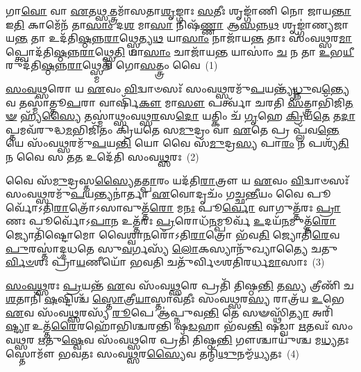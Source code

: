 \setcounter{anuvakam}{0}
𑌗𑌾\-\ul{𑌵𑍋} 𑌵𑌾 \ul{𑌏}\-𑌤\-\ul{𑌥𑍍𑌸}\-𑌤𑍍𑌤𑍍𑌰𑌮𑌾᳴𑌸𑌤𑌾\-\ul{𑌶𑍃}\-𑌙𑍍𑌗𑌾𑌃 \ul{𑌸}\-𑌤𑍀𑌃 𑌶𑍃𑌙𑍍𑌗𑌾᳴𑌣𑌿 𑌨𑍋 𑌜𑌾𑌯\-\ul{𑌨𑍍𑌤𑌾} 𑌇\-\ul{𑌤𑌿} 𑌕𑌾𑌮𑍇᳴𑌨᳴ 𑌤𑌾\-\ul{𑌸𑌾𑌂} 𑌦\-\ul{𑌶} 𑌮𑌾\-\ul{𑌸𑌾} 𑌨𑌿𑌷᳴\-\ul{𑌣𑍍𑌣𑌾} 𑌆\-\ul{𑌸}\-𑌨𑍍𑌨\-\ul{𑌥} 𑌶𑍃𑌙𑍍𑌗𑌾॑𑌣𑍍𑌯𑌜𑌾𑌯\-\ul{𑌨𑍍𑌤} 𑌤𑌾 𑌉𑌦᳴𑌤𑌿\-\ul{𑌷𑍍𑌠}\-𑌨𑍍𑌨\-\ul{𑌰𑌾}\-𑌥𑍍𑌸𑍍𑌮𑍇𑌤𑍍𑌯\-\ul{𑌥} 𑌯𑌾\-\ul{𑌸𑌾𑌂} 𑌨𑌾𑌜𑌾᳴𑌯\-\ul{𑌨𑍍𑌤} 𑌤𑌾𑌃 𑌸𑌂᳴𑌵\-\ul{𑌥𑍍𑌸}\-𑌰\-\ul{𑌮𑌾}\-𑌪𑍍𑌤𑍍𑌵𑍋𑌦᳴𑌤𑌿\-\ul{𑌷𑍍𑌠}\-𑌨𑍍𑌨\-\ul{𑌰𑌾}\-𑌥𑍍𑌸𑍍𑌮𑍇\-\ul{𑌤𑌿} 𑌯𑌾\-\ul{𑌸𑌾𑌂} 𑌚𑌾𑌜𑌾᳴𑌯\-\ul{𑌨𑍍𑌤} 𑌯𑌾𑌸𑌾𑌂॑ \ul{𑌚} 𑌨 𑌤𑌾 \ul{𑌉}\-𑌭\-\ul{𑌯𑍀}\-𑌰𑍁𑌦᳴𑌤𑌿\-\ul{𑌷𑍍𑌠}\-𑌨𑍍𑌨\-\ul{𑌰𑌾}\-𑌥𑍍𑌸𑍍𑌮𑍇𑌤𑌿᳴ 𑌗𑍋\-\ul{𑌸}\-𑌤𑍍𑌤𑍍𑌰𑌂 𑌵𑍈~(1)

\-\ul{𑌸𑌂}\-\-\ul{𑌵}\-\-\ul{𑌥𑍍𑌸}\-𑌰𑍋 𑌯 \ul{𑌏}\-𑌵𑌂 \ul{𑌵𑌿}\-𑌦𑍍𑌵𑌾𑍞𑌸𑌃᳴ 𑌸𑌂𑌵\-\ul{𑌥𑍍𑌸}\-𑌰𑌮𑍁᳴\-\ul{𑌪}\-𑌯𑌨𑍍𑌤𑍍𑌯𑍃᳴\-\ul{𑌧𑍍𑌨𑍁}\-𑌵\-\ul{𑌨𑍍𑌤𑍍𑌯𑍇}\-𑌵 𑌤𑌸𑍍𑌮𑌾॑𑌤𑍍𑌤𑍂\-\ul{𑌪}\-𑌰𑌾 𑌵𑌾𑌰𑍍\mbox{}𑌷𑌿᳴\-\ul{𑌕𑍗} 𑌮𑌾\-\ul{𑌸𑍗} 𑌪𑌰𑍍𑌤𑍍𑌵𑌾᳴ 𑌚𑌰𑌤𑌿 \ul{𑌸}\-𑌤𑍍𑌤𑍍𑌰𑌾𑌭𑌿᳴𑌜𑌿\-\ul{𑌤}\-\-\ul{𑍟} 𑌹𑍍𑌯᳴\-\ul{𑌸𑍍𑌯𑍈} 𑌤𑌸𑍍𑌮𑌾॑𑌥𑍍𑌸𑌂𑌵𑌥𑍍𑌸\-\ul{𑌰}\-𑌸\-\ul{𑌦𑍋} 𑌯𑌤𑍍𑌕𑌿𑌂 𑌚᳴ \ul{𑌗𑍃}\-𑌹𑍇 \ul{𑌕𑍍𑌰𑌿}\-𑌯\-\ul{𑌤𑍇} 𑌤\-\ul{𑌦𑌾}\-𑌪𑍍𑌤𑌮𑌵᳴𑌰𑍁𑌦𑍍𑌧\-\ul{𑌮}\-𑌭𑌿𑌜𑌿᳴𑌤𑌂 𑌕𑍍𑌰𑌿𑌯𑌤𑍇 𑌸\-\ul{𑌮𑍁}\-𑌦𑍍𑌰𑌂 𑌵𑌾 \ul{𑌏}\-𑌤𑍇 𑌪𑍍𑌰 𑌪𑍍𑌲᳴𑌵\-\ul{𑌨𑍍𑌤𑍇} 𑌯𑍇 𑌸𑌂᳴𑌵\-\ul{𑌥𑍍𑌸}\-𑌰𑌮𑍁᳴\-\ul{𑌪}\-𑌯\-\ul{𑌨𑍍𑌤𑌿} 𑌯𑍋 𑌵𑍈 𑌸᳴\-\ul{𑌮𑍁}\-𑌦𑍍𑌰\-\ul{𑌸𑍍𑌯} 𑌪𑌾\-\ul{𑌰𑌂} 𑌨 𑌪𑌶𑍍𑌯᳴\-\ul{𑌤𑌿} 𑌨 𑌵𑍈 𑌸 𑌤\-\ul{𑌤} 𑌉𑌦𑍇᳴𑌤𑌿 𑌸𑌂𑌵\-\ul{𑌥𑍍𑌸}\-𑌰𑌃~(2)

𑌵𑍈 𑌸᳴\-\ul{𑌮𑍁}\-𑌦𑍍𑌰𑌸𑍍𑌤\-\ul{𑌸𑍍𑌯𑍈}\-𑌤\-\ul{𑌤𑍍𑌪𑌾}\-𑌰𑌂 𑌯𑌦᳴𑌤𑌿\-\ul{𑌰𑌾}\-𑌤𑍍𑌰𑍗 𑌯 \ul{𑌏}\-𑌵𑌂 \ul{𑌵𑌿}\-𑌦𑍍𑌵𑌾𑍞𑌸𑌃᳴ 𑌸𑌂𑌵\-\ul{𑌥𑍍𑌸}\-𑌰𑌮𑍁᳴\-\ul{𑌪}\-𑌯𑌨𑍍𑌤𑍍𑌯𑌨𑌾॑𑌰𑍍𑌤𑌾 \ul{𑌏}\-𑌵𑍋𑌦𑍃𑌚𑌂᳴ 𑌗𑌚𑍍𑌛\-\ul{𑌨𑍍𑌤𑍀}\-𑌯𑌂 𑌵𑍈 𑌪𑍂𑌰𑍍𑌵𑍋᳴\-𑌽𑌤𑌿\-\ul{𑌰𑌾}\-𑌤𑍍𑌰𑍋᳴\-𑌽\-𑌸𑌾𑌵𑍁𑌤𑍍𑌤᳴\-\ul{𑌰𑍋} 𑌮\-\ul{𑌨𑌃} 𑌪𑍂\-\ul{𑌰𑍍𑌵𑍋} 𑌵𑌾𑌗𑍁𑌤𑍍𑌤᳴𑌰𑌃 \ul{𑌪𑍍𑌰𑌾}\-𑌣𑌃 𑌪𑍂𑌰𑍍𑌵𑍋᳴\-𑌽\-\ul{𑌪𑌾}\-𑌨 𑌉𑌤𑍍𑌤᳴𑌰𑌃 \ul{𑌪𑍍𑌰}\-𑌰𑍋𑌧᳴\-\ul{𑌨}\-𑌮𑍍𑌪𑍂𑌰𑍍𑌵᳴ \ul{𑌉}\-𑌦𑌯᳴\-\ul{𑌨}\-𑌮𑍁𑌤𑍍𑌤᳴\-\ul{𑌰𑍋} 𑌜𑍍𑌯𑍋𑌤𑌿᳴𑌷𑍍𑌟𑍋𑌮𑍋 𑌵𑍈𑌶𑍍𑌵𑌾\-\ul{𑌨}\-𑌰𑍋᳴\-𑌽𑌤𑌿\-\ul{𑌰𑌾}\-𑌤𑍍𑌰𑍋 𑌭᳴𑌵\-\ul{𑌤𑌿} 𑌜𑍍𑌯𑍋𑌤𑌿᳴\-\ul{𑌰𑍇}\-𑌵 \ul{𑌪𑍁}\-𑌰𑌸𑍍𑌤𑌾॑𑌦𑍍𑌦𑌧𑌤𑍇 𑌸𑍁\-\ul{𑌵}\-𑌰𑍍𑌗𑌸𑍍𑌯᳴ \ul{𑌲𑍋}\-𑌕𑌸𑍍𑌯𑌾𑌨𑍁᳴𑌖𑍍𑌯𑌾𑌤𑍍𑌯𑍈 𑌚𑌤𑍁\-\ul{𑌰𑍍𑌵𑌿}\-\-\ul{𑍞}\-𑌶𑌃 𑌪𑍍𑌰𑌾᳴\-\ul{𑌯}\-𑌣𑍀𑌯𑍋᳴ 𑌭𑌵𑌤𑌿 𑌚𑌤𑍁᳴𑌰𑍍𑌵𑌿𑍞𑌶𑌤𑌿𑌰𑌰𑍍𑌧\-\ul{𑌮𑌾}\-𑌸𑌾𑌃~(3)

\-\ul{𑌸𑌂}\-\-\ul{𑌵}\-\-\ul{𑌥𑍍𑌸}\-𑌰𑌃 \ul{𑌪𑍍𑌰}\-𑌯𑌨𑍍𑌤᳴ \ul{𑌏}\-𑌵 𑌸𑌂᳴𑌵\-\ul{𑌥𑍍𑌸}\-𑌰𑍇 𑌪𑍍𑌰𑌤𑌿᳴ 𑌤𑌿𑌷𑍍𑌠\-\ul{𑌨𑍍𑌤𑌿} 𑌤\-\ul{𑌸𑍍𑌯} 𑌤𑍍𑌰𑍀𑌣𑌿᳴ 𑌚 \ul{𑌶}\-𑌤𑌾𑌨𑌿᳴ \ul{𑌷}\-𑌷𑍍𑌟𑌿𑌶𑍍𑌚᳴ \ul{𑌸𑍍𑌤𑍋}\-𑌤𑍍𑌰𑍀\-\ul{𑌯𑌾}\-𑌸𑍍𑌤𑌾𑌵᳴𑌤𑍀𑌃 𑌸𑌂𑌵\-\ul{𑌥𑍍𑌸}\-𑌰\-\ul{𑌸𑍍𑌯} 𑌰𑌾𑌤𑍍𑌰᳴𑌯 \ul{𑌉}\-𑌭𑍇 \ul{𑌏}\-𑌵 𑌸𑌂᳴𑌵\-\ul{𑌥𑍍𑌸}\-𑌰𑌸𑍍𑌯᳴ \ul{𑌰𑍂}\-𑌪𑍇 𑌆॑𑌪𑍍𑌨𑍁𑌵\-\ul{𑌨𑍍𑌤𑌿} 𑌤𑍇 𑌸𑍟𑌸𑍍𑌥𑌿᳴\-\ul{𑌤𑍍𑌯𑌾} 𑌅𑌰𑌿᳴\-\ul{𑌷𑍍𑌟𑍍𑌯𑌾} 𑌉𑌤𑍍𑌤᳴\-\ul{𑌰𑍈}\-𑌰𑌹𑍋᳴𑌭𑌿𑌶𑍍𑌚𑌰𑌨𑍍𑌤𑌿 𑌷\-\ul{𑌡}\-𑌹𑌾 𑌭᳴𑌵\-\ul{𑌨𑍍𑌤𑌿} 𑌷𑌡𑍍𑌵𑌾 \ul{𑌋}\-𑌤𑌵𑌃᳴ 𑌸𑌂𑌵\-\ul{𑌥𑍍𑌸}\-𑌰 \ul{𑌋}\-𑌤𑍁\-\ul{𑌷𑍍𑌵𑍇}\-𑌵 𑌸𑌂᳴𑌵\-\ul{𑌥𑍍𑌸}\-𑌰𑍇 𑌪𑍍𑌰𑌤𑌿᳴ 𑌤𑌿𑌷𑍍𑌠\-\ul{𑌨𑍍𑌤𑌿} 𑌗𑍗𑌶𑍍𑌚𑌾𑌯𑍁᳴𑌶𑍍𑌚 𑌮\-\ul{𑌧𑍍𑌯}\-𑌤𑌃 𑌸𑍍𑌤𑍋𑌮𑍗᳴ 𑌭𑌵𑌤𑌃 𑌸𑌂𑌵\-\ul{𑌥𑍍𑌸}\-𑌰\-\ul{𑌸𑍍𑌯𑍈}\-𑌵 𑌤𑌨𑍍𑌮𑌿᳴\-\ul{𑌥𑍁}\-𑌨𑌮𑍍𑌮᳴\-\ul{𑌧𑍍𑌯}\-𑌤𑌃~(4)

